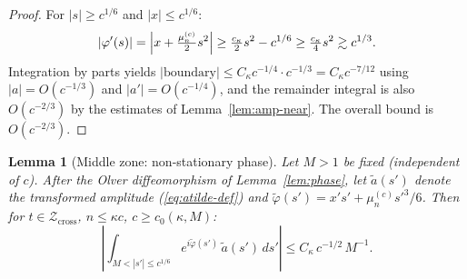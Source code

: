 \documentclass[12pt,a4paper]{amsart}
\newtheorem{lemma}[theorem]{Lemma}
\theoremstyle{definition}
\theoremstyle{remark}
\newcommand{\Zcross}{\mathcal{Z}_{\mathrm{cross}}}
\begin{document}
\begin{proof}
For $|s| \ge c^{1/6}$ and $|x| \le c^{1/6}$:
\[
  |\varphi'(s)| = \Bigl|x + \tfrac{\mu_n^{(c)}}{2}s^2\Bigr|
  \ge \tfrac{c_\kappa}{2}s^2 - c^{1/6}
  \ge \tfrac{c_\kappa}{4}s^2
  \gtrsim c^{1/3}.
\]
Integration by parts yields
$|\text{boundary}| \le C_\kappa c^{-1/4}\cdot c^{-1/3}
= C_\kappa c^{-7/12}$
using $|a| = O(c^{-1/3})$ and $|a'| = O(c^{-1/4})$,
and the remainder integral is also $O(c^{-2/3})$
by the estimates of Lemma~\ref{lem:amp-near}.
The overall bound is $O(c^{-2/3})$.
\end{proof}

\begin{lemma}[Middle zone: non-stationary phase]
\label{lem:intermediate}
Let $M > 1$ be fixed \textup{(}independent of $c$\textup{)}.
After the Olver diffeomorphism of
Lemma~\textup{\ref{lem:phase}},
let $\tilde{a}(s')$ denote the transformed amplitude
\textup{(}\eqref{eq:atilde-def}\textup{)}
and $\tilde\varphi(s') = x's' + \mu_n^{(c)}s'^3/6$.
Then for $t \in \Zcross$, $n \le \kappa c$,
$c \ge c_0(\kappa, M)$:
\[
  \left|\int_{M < |s'| \le c^{1/6}}
  e^{i\tilde\varphi(s')}\,\tilde{a}(s')\,ds'\right|
  \le C_\kappa\,c^{-1/2}\,M^{-1}.
\]
\end{lemma}
\end{document}
